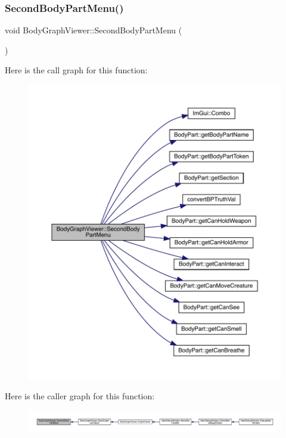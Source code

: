 \subsubsection{\texorpdfstring{Second\+Body\+Part\+Menu()}{SecondBodyPartMenu()}}
{\footnotesize\ttfamily void Body\+Graph\+Viewer\+::\+Second\+Body\+Part\+Menu (\begin{DoxyParamCaption}{ }\end{DoxyParamCaption})}

Here is the call graph for this function\+:
\nopagebreak
\begin{figure}[H]
\begin{center}
\leavevmode
\includegraphics[width=350pt]{df/d9e/namespace_body_graph_viewer_a8f24a618383585f0b013da6054244e2c_cgraph}
\end{center}
\end{figure}
Here is the caller graph for this function\+:
\nopagebreak
\begin{figure}[H]
\begin{center}
\leavevmode
\includegraphics[width=350pt]{df/d9e/namespace_body_graph_viewer_a8f24a618383585f0b013da6054244e2c_icgraph}
\end{center}
\end{figure}
\mbox{\label{namespace_body_graph_viewer_ae2458c73737cf4926078c6415ee2087b}} 
